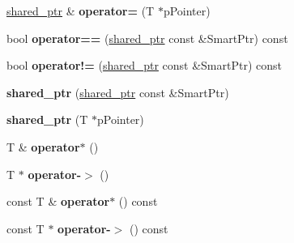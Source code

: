 \begin{DoxyCompactItemize}
\item 
\hypertarget{classgli_1_1shared__ptr_a560d99b0949454bd569d4ae1e5769b3b}{\hyperlink{classgli_1_1shared__ptr}{shared\-\_\-ptr} \& {\bfseries operator=} (\-T $\ast$p\-Pointer)}\label{classgli_1_1shared__ptr_a560d99b0949454bd569d4ae1e5769b3b}

\item 
\hypertarget{classgli_1_1shared__ptr_a0fbab40d4b8c0fc6fd44cf97b7f4abe8}{bool {\bfseries operator==} (\hyperlink{classgli_1_1shared__ptr}{shared\-\_\-ptr} const \&\-Smart\-Ptr) const }\label{classgli_1_1shared__ptr_a0fbab40d4b8c0fc6fd44cf97b7f4abe8}

\item 
\hypertarget{classgli_1_1shared__ptr_a45fd1926de7178c7d66b6f2591723bd4}{bool {\bfseries operator!=} (\hyperlink{classgli_1_1shared__ptr}{shared\-\_\-ptr} const \&\-Smart\-Ptr) const }\label{classgli_1_1shared__ptr_a45fd1926de7178c7d66b6f2591723bd4}

\item 
\hypertarget{classgli_1_1shared__ptr_a4a1ee3639c823c5bcdd99532954be8c6}{{\bfseries shared\-\_\-ptr} (\hyperlink{classgli_1_1shared__ptr}{shared\-\_\-ptr} const \&\-Smart\-Ptr)}\label{classgli_1_1shared__ptr_a4a1ee3639c823c5bcdd99532954be8c6}

\item 
\hypertarget{classgli_1_1shared__ptr_ad30fce7cdc1a045dc51881913691cf0e}{{\bfseries shared\-\_\-ptr} (\-T $\ast$p\-Pointer)}\label{classgli_1_1shared__ptr_ad30fce7cdc1a045dc51881913691cf0e}

\item 
\hypertarget{classgli_1_1shared__ptr_afe0723ed05cc3f8bd6ae44750c86af89}{\-T \& {\bfseries operator$\ast$} ()}\label{classgli_1_1shared__ptr_afe0723ed05cc3f8bd6ae44750c86af89}

\item 
\hypertarget{classgli_1_1shared__ptr_a407f697d5549226786bad55ee2b31ae4}{\-T $\ast$ {\bfseries operator-\/$>$} ()}\label{classgli_1_1shared__ptr_a407f697d5549226786bad55ee2b31ae4}

\item 
\hypertarget{classgli_1_1shared__ptr_a31f3a34f3d6aac4d941bb954fb139132}{const \-T \& {\bfseries operator$\ast$} () const }\label{classgli_1_1shared__ptr_a31f3a34f3d6aac4d941bb954fb139132}

\item 
\hypertarget{classgli_1_1shared__ptr_ac28bb6536a426157b060237200d1394c}{const \-T $\ast$ {\bfseries operator-\/$>$} () const }\label{classgli_1_1shared__ptr_ac28bb6536a426157b060237200d1394c}


\end{DoxyCompactItemize}
